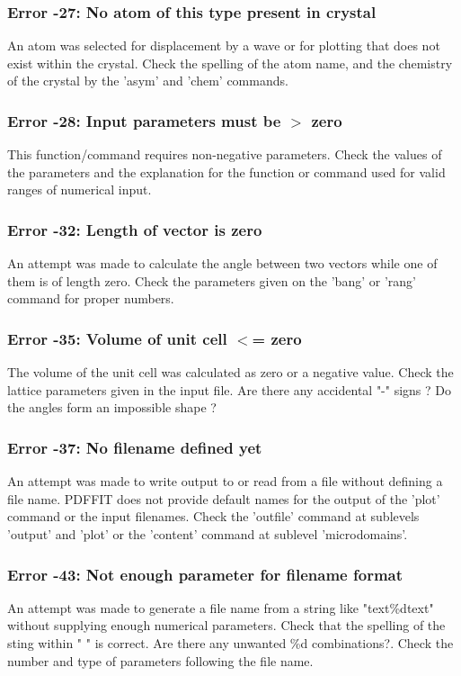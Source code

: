 \subsubsection{Error -27: No atom of this type present in crystal}
\par
An atom was selected for displacement by a wave or for plotting that 
does not exist within the crystal. Check the spelling of the atom 
name, and the chemistry of the crystal by the 'asym' and 'chem' 
commands. 
\subsubsection{Error -28: Input parameters must be $> $ zero}
\par
This function/command requires non-negative parameters. 
Check the values of the parameters and the explanation for the function 
or command used for valid ranges of numerical input. 
\subsubsection{Error -32: Length of vector is zero}
\par
An attempt was made to calculate the angle between two vectors 
while one of them is of length zero. Check the parameters given 
on the 'bang' or 'rang' command for proper numbers. 
\subsubsection{Error -35: Volume of unit cell $ <$= zero}
\par
The volume of the unit cell was calculated as zero or a negative 
value. 
Check the lattice parameters given in the input file. Are there 
any accidental "-" signs ? Do the angles form an impossible shape ? 
\subsubsection{Error -37: No filename defined yet}
\par
An attempt was made to write output to or read from a file without 
defining a file name. PDFFIT does not provide default names for the 
output of the 'plot' command or the input filenames. Check the 
'outfile' command at sublevels 'output' and 'plot' or the 'content' 
command at sublevel 'microdomains'. 
\subsubsection{Error -43: Not enough parameter for filename format}
\par
An attempt was made to generate a file name from a string like 
"text\%dtext" without supplying enough numerical parameters. 
Check that the spelling of the sting within " " is correct. Are 
there any unwanted \%d combinations?. Check the number and type 
of parameters following the file name. 
